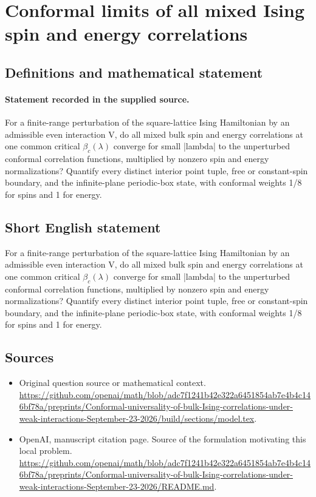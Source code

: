 \documentclass[11pt]{article}
\begin{document}
\section*{Conformal limits of all mixed Ising spin and energy correlations}\label{30007409}
\subsection{Definitions and mathematical statement}
\paragraph{Statement recorded in the supplied source.}
For a finite-range perturbation of the square-lattice Ising Hamiltonian by an admissible even interaction V, do all mixed bulk spin and energy correlations at one common critical $\beta _c(\lambda )$ converge for small |lambda| to the unperturbed conformal correlation functions, multiplied by nonzero spin and energy normalizations? Quantify every distinct interior point tuple, free or constant-spin boundary, and the infinite-plane periodic-box state, with conformal weights 1/8 for spins and 1 for energy.
\subsection{Short English statement}
For a finite-range perturbation of the square-lattice Ising Hamiltonian by an admissible even interaction V, do all mixed bulk spin and energy correlations at one common critical $\beta _c(\lambda )$ converge for small |lambda| to the unperturbed conformal correlation functions, multiplied by nonzero spin and energy normalizations? Quantify every distinct interior point tuple, free or constant-spin boundary, and the infinite-plane periodic-box state, with conformal weights 1/8 for spins and 1 for energy.
\subsection{Sources}
\begin{itemize}
\item[S1] Original question source or mathematical context.
\url{https://github.com/openai/math/blob/adc7f1241b42e322a6451854ab7e4b4c146bf78a/preprints/Conformal-universality-of-bulk-Ising-correlations-under-weak-interactions-September-23-2026/build/sections/model.tex}.
\item[S2] OpenAI, manuscript citation page. Source of the formulation motivating this local problem.
\url{https://github.com/openai/math/blob/adc7f1241b42e322a6451854ab7e4b4c146bf78a/preprints/Conformal-universality-of-bulk-Ising-correlations-under-weak-interactions-September-23-2026/README.md}.
\end{itemize}
\end{document}

